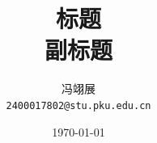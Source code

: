 \title{\textbf{标题} \\[0.5em]
    \Large 副标题}
\author{冯翊展 \\ 
    \normalsize{\texttt{2400017802@stu.pku.edu.cn}}}
\date{\today}
